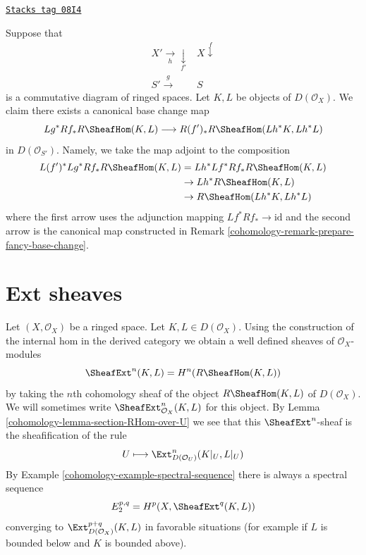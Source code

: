 \begin{remark}
\label{cohomology-remark-fancy-base-change}
\href{https://stacks.math.columbia.edu/tag/08I4}{\texttt{Stacks tag 08I4}}

Suppose that
$$
\begin{array}{cc}X' \underset{h}{\longrightarrow}\underset{f'}{\downarrow} & X \overset{f}{\downarrow} \\ S' \overset{g}{\longrightarrow} & S\end{array}
$$
is a commutative diagram of ringed spaces. Let $K, L$ be objects
of $D(\mathcal{O}_X)$. We claim there exists a canonical base change
map
$$
Lg^*Rf_*R\SheafHom(K, L)
\longrightarrow
R(f')_*R\SheafHom(Lh^*K, Lh^*L)
$$
in $D(\mathcal{O}_{S'})$. Namely, we take the map adjoint to
the composition
\begin{align*}
L(f')^*Lg^*Rf_*R\SheafHom(K, L)
& =
Lh^*Lf^*Rf_*R\SheafHom(K, L) \\
& \to
Lh^*R\SheafHom(K, L) \\
& \to
R\SheafHom(Lh^*K, Lh^*L)
\end{align*}
where the first arrow uses the adjunction mapping
$Lf^*Rf_* \to \text{id}$ and the second arrow is the canonical map
constructed in Remark \ref{cohomology-remark-prepare-fancy-base-change}.
\end{remark}

\section{Ext sheaves}
\label{cohomology-section-ext}
Let $(X, \mathcal{O}_X)$ be a ringed space. Let $K, L \in D(\mathcal{O}_X)$.
Using the construction of the internal hom in the derived category we
obtain a well defined sheaves of $\mathcal{O}_X$-modules
$$
\SheafExt^n(K, L) = H^n(R\SheafHom(K, L))
$$
by taking the $n$th cohomology sheaf of the object $R\SheafHom(K, L)$
of $D(\mathcal{O}_X)$. We will sometimes write
$\SheafExt^n_{\mathcal{O}_X}(K, L)$ for this object.
By Lemma \ref{cohomology-lemma-section-RHom-over-U}
we see that this $\SheafExt^n$-sheaf
is the sheafification of the rule
$$
U \longmapsto \Ext^n_{D(\mathcal{O}_U)}(K|_U, L|_U)
$$
By Example \ref{cohomology-example-spectral-sequence} there is always a spectral
sequence
$$
E_2^{p, q} = H^p(X, \SheafExt^q(K, L))
$$
converging to $\Ext^{p + q}_{D(\mathcal{O}_X)}(K, L)$
in favorable situations (for example if $L$ is bounded below and
$K$ is bounded above).

